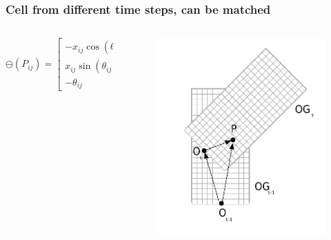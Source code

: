 \documentclass{beamer}
\begin{document}
	\begin{frame}
		\frametitle{Cell from different time steps, can be matched}

		  \begin{columns}[t]
		  \begin{column}{5cm}
			\begin{equation}
			\ominus (P_{ij}) = \left[ \begin{array}{c} %
			-x_{ij}\cos(\theta_{ij})-y_{ij}\sin(\theta_{ij}) \\
			x_{ij}\sin(\theta_{ij})-y_{ij}\cos(\theta_{ij}) \\
			-\theta_{ij} \end{array} \right] 
			\label{eq:invpose}
			\end{equation}
		  \end{column}
		  
		  \begin{column}{5cm}
			\begin{figure}[h]
			\center
			\includegraphics[scale=0.5]{../img/fig:translation}
			\end{figure}	
		  \end{column}
		 \end{columns}		 

	\end{frame}
\end{document}
